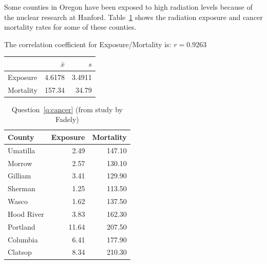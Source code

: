 \documentclass[letterpaper, landscape]{exam}
\begin{document}
\begin{questions}
\begin{parts}
      \end{parts}

      \question{}\label{q:cancer}

      Some counties in Oregon have been exposed to high radiation levels because
      of the nuclear research at Hanford.  Table~\ref{tab:cancer} shows the
      radiation exposure and cancer mortality rates for some of these counties.

      The correlation coefficient for Exposure/Mortality is: $r = 0.9263$

      \begin{table}[ht]
        \centering
        \begin{tabular}{lrr}
          \toprule
                    & $\bar{x}$ & $s$    \\
          \midrule              
          Exposure  & 4.6178    & 3.4911 \\
          Mortality & 157.34    & 34.79  \\
          \bottomrule
        \end{tabular}
      \end{table}

      \begin{table}[ht]
        \centering
        \begin{tabular}{lrr}
          \toprule
          County     & Exposure & Mortality \\
          \midrule
          Umatilla   & 2.49     & 147.10 \\
          Morrow     & 2.57     & 130.10 \\
          Gilliam    & 3.41     & 129.90 \\
          Sherman    & 1.25     & 113.50 \\
          Wasco      & 1.62     & 137.50 \\
          Hood River & 3.83     & 162.30 \\
          Portland   & 11.64    & 207.50 \\
          Columbia   & 6.41     & 177.90 \\
          Clatsop    & 8.34     & 210.30 \\
          \bottomrule
        \end{tabular}
        \caption{Question~\ref{q:cancer} (from study by Fadely)}\label{tab:cancer}
      \end{table}


\end{questions}
\end{document}
